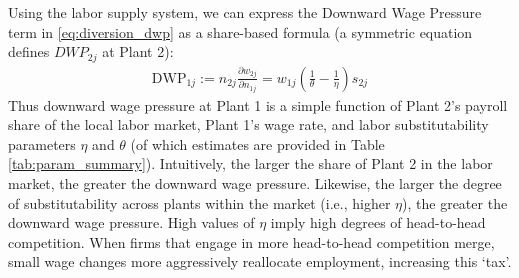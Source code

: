 \documentclass[12pt]{article}
\theoremstyle{prop}
\begin{document}
Using the labor supply system, we can express the Downward Wage Pressure term in \eqref{eq:diversion_dwp} as a share-based formula (a symmetric equation defines $DWP_{2j}$ at Plant 2):
\begin{align}\label{eq:dwp}
	\text{DWP}_{1j}:=n_{2j}\frac{\partial w_{2j}}{\partial n_{1j}}=w_{1j}\left(\frac{1}{\theta}-\frac{1}{\eta}\right)s_{2j}
\end{align}%
Thus downward wage pressure at Plant 1 is a simple function of Plant 2's payroll share of the local labor market, Plant 1's wage rate, and labor substitutability parameters  $\eta$ and $\theta$ (of which estimates are provided in Table \ref{tab:param_summary}). 
Intuitively, the larger the share of Plant 2 in the labor market, the greater the downward wage pressure. 
Likewise, the larger the degree of substitutability across plants within the market (i.e., higher $\eta$), the greater the downward wage pressure. 
High values of $\eta$ imply high degrees of head-to-head competition. 
When firms that engage in more head-to-head competition merge, small wage changes more aggressively reallocate employment, increasing this `tax'. 
\end{document}
